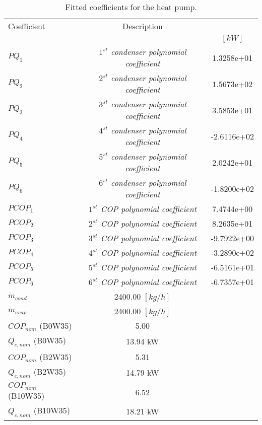 \documentclass[english]{SPFShortReport}
\author{Dani Carbonell}
\begin{document}
\begin{table}[!ht]
\begin{small}
\caption{Fitted coefficients for the heat pump.}
\begin{center}
\resizebox{12cm}{!} 
{
\begin{tabular}{l | c c } 
\hline
\hline
Coefficient &Description & \\ 
 & &$[kW]$\\ 
\hline
$PQ_{1}$ & \emph{$1^{st}$ condenser polynomial coefficient}  & 1.3258e+01    \\ 
$PQ_{2}$ & \emph{$2^{st}$ condenser polynomial coefficient}  & 1.5673e+02    \\ 
$PQ_{3}$ & \emph{$3^{st}$ condenser polynomial coefficient}  & 3.5853e+01    \\ 
$PQ_{4}$ & \emph{$4^{st}$ condenser polynomial coefficient}  & -2.6116e+02    \\ 
$PQ_{5}$ & \emph{$5^{st}$ condenser polynomial coefficient}  & 2.0242e+01    \\ 
$PQ_{6}$ & \emph{$6^{st}$ condenser polynomial coefficient}  & -1.8200e+02    \\ 
\hline
$PCOP_{1}$ & \emph{$1^{st}$ COP polynomial coefficient}  & 7.4744e+00    \\ 
$PCOP_{2}$ & \emph{$2^{st}$ COP polynomial coefficient}  & 8.2635e+01    \\ 
$PCOP_{3}$ & \emph{$3^{st}$ COP polynomial coefficient}  & -9.7922e+00    \\ 
$PCOP_{4}$ & \emph{$4^{st}$ COP polynomial coefficient}  & -3.2890e+02    \\ 
$PCOP_{5}$ & \emph{$5^{st}$ COP polynomial coefficient}  & -6.5161e+01    \\ 
$PCOP_{6}$ & \emph{$6^{st}$ COP polynomial coefficient}  & -6.7357e+01    \\ 
\hline
$\dot m_{cond}$ & 2400.00 $[kg/h]$\\ 
$\dot m_{evap}$ & 2400.00 $[kg/h]$\\ 
\hline
$COP_{nom}$ (B0W35)& 5.00 \\ 
$Q_{c,nom}$ (B0W35)& 13.94 kW\\ 
$COP_{nom}$ (B2W35)& 5.31 \\ 
$Q_{c,nom}$ (B2W35)& 14.79 kW\\ 
$COP_{nom}$ (B10W35)& 6.52 \\ 
$Q_{c,nom}$ (B10W35)& 18.21 kW\\ 
\hline
\hline
\end{tabular}
}
\label{CoefTable}
\end{center}
\end{small}
\end{table}
\end{document}
